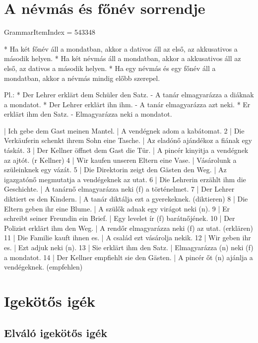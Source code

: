 \documentclass{article}
\newenvironment{desc}{\verbatim}{\endverbatim}
\newenvironment{exmp}{\verbatim}{\endverbatim}
\begin{document}
\section{A névmás és főnév sorrendje}

GrammarItemIndex = 543348

\begin{desc}
* Ha két főnév áll a mondatban, akkor a dativos áll az első, az akkusativos a második helyen.
* Ha két névmás áll a mondatban, akkor a akkusativos áll az első, az dativos a második helyen.
* Ha egy névmás és egy főnév áll a mondatban, akkor a névmás mindig előbb szerepel.

Pl.: * Der Lehrer erklärt dem Schüler den Satz. - A tanár elmagyarázza a diáknak a mondatot.
* Der Lehrer erklärt ihn ihm. - A tanár elmagyarázza azt neki.
* Er erklärt ihm den Satz. - Elmagyarázza neki a mondatot.
\end{desc}

\begin{exmp}
1 | Ich gebe dem Gast meinen Mantel. | A vendégnek adom a kabátomat.
2 | Die Verkäuferin schenkt ihrem Sohn eine Tasche. | Az eladónő ajándékoz a fiának egy táskát.
3 | Der Kellner öffnet dem Gast die Tür. | A pincér kinyitja a vendégnek az ajtót. (r Kellner)
4 | Wir kaufen unseren Eltern eine Vase. | Vásárolunk a szüleinknek egy vázát.
5 | Die Direktorin zeigt den Gästen den Weg. | Az igazgatónő megmutatja a vendégeknek az utat.
6 | Die Lehrerin erzählt ihm die Geschichte. | A tanárnő elmagyarázza neki (f) a történelmet.
7 | Der Lehrer diktiert es den Kindern. | A tanár diktálja ezt a gyerekeknek. (diktieren)
8 | Die Eltern geben ihr eine Blume. | A szülők adnak egy virágot neki (n).
9 | Er schreibt seiner Freundin ein Brief. | Egy levelet ír (f) barátnőjének.
10 | Der Polizist erklärt ihm den Weg. | A rendőr elmagyarázza neki (f) az utat. (erklären)
11 | Die Familie kauft ihnen es. | A család ezt vásárolja nekik.
12 | Wir geben ihr es. | Ezt adjuk neki (n).
13 | Sie erklärt ihm den Satz. | Elmagyarázza (n) neki (f) a mondatot.
14 | Der Kellner empfiehlt sie den Gästen. | A pincér őt (n) ajánlja a vendégeknek. (empfehlen)
\end{exmp}

\section{Igekötős igék}

\subsection{Elváló igekötős igék}
\end{document}
